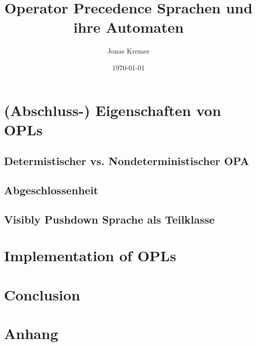 \documentclass{article}
\author{Jonas Kremer}
\title{Operator Precedence Sprachen und ihre Automaten}
\date{\today{}}
\theoremstyle{remark}
\begin{document}
\maketitle
\newpage
\tableofcontents
\newpage






\section{(Abschluss-) Eigenschaften von OPLs}

\subsection{Determistischer vs. Nondeterministischer OPA}

\subsection{Abgeschlossenheit}

\subsection{Visibly Pushdown Sprache als Teilklasse}

\section{Implementation of OPLs}

\section{Conclusion}

\appendix

\section*{Anhang}


\end{document}

